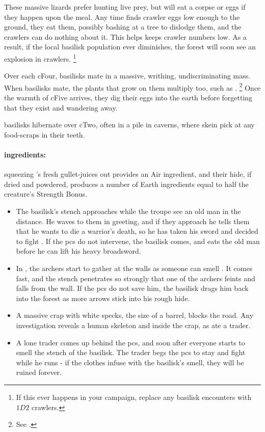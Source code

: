 \begin{multicols}{2}
These massive lizards prefer hunting live prey, but will eat a corpse or eggs if they happen upon the meal.
Any time  finds \gls{crawler} eggs low enough to the ground, they eat them, possibly bashing at a tree to dislodge them, and the \glspl{crawler} can do nothing about it.
This helps keeps crawler numbers low.
As a result, if the local \gls{basilisk} population ever diminishes, the forest will soon see an explosion in \glspl{crawler}.%
\footnote{If this ever happens in your campaign, replace any \gls{basilisk} encounters with $1D2$ \glspl{crawler}.}

Over each \gls{cFour}, \glspl{basilisk} mate in a massive, writhing, undiscriminating mass.
When \glspl{basilisk} mate, the plants that grow on them multiply too, such as .%
\footnote{See .}
Once the warmth of \gls{cFive} arrives, they dig their eggs into the earth before forgetting that they exist and wandering away.

\Glspl{basilisk} hibernate over \gls{cTwo}, often in a pile in caverns, where skein pick at any food-scraps in their teeth.

\paragraph{\Glspl{ingredient}:}
squeezing 's fresh gullet-juices out provides an Air \gls{ingredient}, and their hide, if dried and powdered, produces a number of Earth \glspl{ingredient} equal to half the creature's Strength Bonus.

\showEnc

\begin{itemize}
  \item{The \gls{basilisk}'s stench approaches while the troupe see an old man in the distance.
  He waves to them in greeting, and if they approach he tells them that he wants to die a warrior's death, so he has taken his sword and decided to fight .
  If the \glspl{pc} do not intervene, the \gls{basilisk} comes, and eats the old man before he can lift his heavy broadsword.}
  \item
  In , the archers start to gather at the walls as someone can smell .
  It comes fast, and the stench penetrates so strongly that one of the archers feints and falls from the wall.
  If the \glspl{pc} do not save him, the \gls{basilisk} drags him back into the forest as more arrows stick into his rough hide.
  \item
  A massive crap with white specks, the size of a barrel, blocks the road.
  Any investigation reveals a human skeleton and  inside the crap, as  ate a trader.
  \item
  A lone trader comes up behind the \glspl{pc}, and soon after everyone starts to smell the stench of the \gls{basilisk}.
  The trader begs the \glspl{pc} to stay and fight while he runs - if the clothes infuse with the \gls{basilisk}'s smell, they will be ruined forever.
\end{itemize}


\end{multicols}
